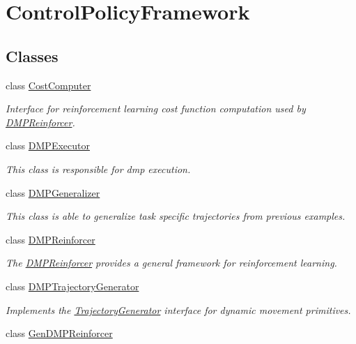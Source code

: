 \hypertarget{group__ControlPolicyFramework}{\section{\-Control\-Policy\-Framework}
\label{group__ControlPolicyFramework}
}
\subsection*{\-Classes}
\begin{DoxyCompactItemize}
\item 
class \hyperlink{classCostComputer}{\-Cost\-Computer}
\begin{DoxyCompactList}\small\item\em \-Interface for reinforcement learning cost function computation used by \hyperlink{classDMPReinforcer}{\-D\-M\-P\-Reinforcer}. \end{DoxyCompactList}\item 
class \hyperlink{classDMPExecutor}{\-D\-M\-P\-Executor}
\begin{DoxyCompactList}\small\item\em \-This class is responsible for dmp execution. \end{DoxyCompactList}\item 
class \hyperlink{classDMPGeneralizer}{\-D\-M\-P\-Generalizer}
\begin{DoxyCompactList}\small\item\em \-This class is able to generalize task specific trajectories from previous examples. \end{DoxyCompactList}\item 
class \hyperlink{classDMPReinforcer}{\-D\-M\-P\-Reinforcer}
\begin{DoxyCompactList}\small\item\em \-The \hyperlink{classDMPReinforcer}{\-D\-M\-P\-Reinforcer} provides a general framework for reinforcement learning. \end{DoxyCompactList}\item 
class \hyperlink{classDMPTrajectoryGenerator}{\-D\-M\-P\-Trajectory\-Generator}
\begin{DoxyCompactList}\small\item\em \-Implements the \hyperlink{classTrajectoryGenerator}{\-Trajectory\-Generator} interface for dynamic movement primitives. \end{DoxyCompactList}\item 
class \hyperlink{classGenDMPReinforcer}{\-Gen\-D\-M\-P\-Reinforcer}

\end{DoxyCompactItemize}
